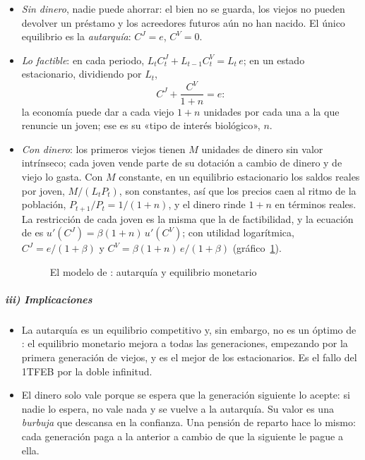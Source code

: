 \documentclass[11pt]{article}
\begin{document}
\begin{itemize}
\item \emph{Sin dinero}, nadie puede ahorrar: el bien no se guarda, los viejos no pueden devolver un préstamo y los acreedores futuros aún no han nacido. El único equilibrio es la \emph{autarquía}: $C^J=e$, $C^V=0$.
\item \emph{Lo factible}: en cada periodo, $L_tC^J_t+L_{t-1}C^V_t=L_t\,e$; en un estado estacionario, dividiendo por $L_t$,
  \begin{equation*}
  C^J+\frac{C^V}{1+n}=e:
  \end{equation*}
  la economía puede dar a cada viejo $1+n$ unidades por cada una a la que renuncie un joven; ese es su «tipo de interés biológico», $n$.
\item \emph{Con dinero}: los primeros viejos tienen $M$ unidades de dinero sin valor intrínseco; cada joven vende parte de su dotación a cambio de dinero y de viejo lo gasta. Con $M$ constante, en un equilibrio estacionario los saldos reales por joven, $M/(L_tP_t)$, son constantes, así que los precios caen al ritmo de la población, $P_{t+1}/P_t=1/(1+n)$, y el dinero rinde $1+n$ en términos reales. La restricción de cada joven es la misma que la de factibilidad, y la ecuación de  es $u'(C^J)=\beta(1+n)\,u'(C^V)$; con utilidad logarítmica, $C^J=e/(1+\beta)$ y $C^V=\beta(1+n)\,e/(1+\beta)$ (gráfico~\ref{fig:samuelson}).
  \begin{figure}[H]
  \centering
  \caption{El modelo de : autarquía y equilibrio monetario}\label{fig:samuelson}
  \end{figure}
\end{itemize}

\subparagraph{iii) Implicaciones}

\begin{itemize}
\item La autarquía es un equilibrio competitivo y, sin embargo, no es un óptimo de : el equilibrio monetario mejora a todas las generaciones, empezando por la primera generación de viejos, y es el mejor de los estacionarios. Es el fallo del 1TFEB por la doble infinitud.
\item El dinero solo vale porque se espera que la generación siguiente lo acepte: si nadie lo espera, no vale nada y se vuelve a la autarquía. Su valor es una \emph{burbuja} que descansa en la confianza. Una pensión de reparto hace lo mismo: cada generación paga a la anterior a cambio de que la siguiente le pague a ella.
\end{itemize}
\end{document}
